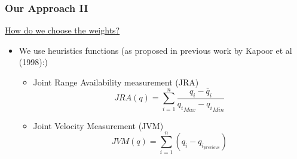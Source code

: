 \documentclass[10pt]{beamer}
\newcommand{\q}{\ensuremath{q}}
\begin{document}
\begin{frame}
\frametitle{Our Approach II}

\begin{center}
	\begin{normalsize}
		{\color{blue} \underline{How do we choose the weights?}}
	\end{normalsize}
\end{center}

\begin{itemize}
\item{ We use heuristics functions (as proposed in previous work by Kapoor et al (1998):) 
	\begin{itemize}
		\item{ {\color{blue}Joint Range Availability measurement (JRA) }
			\begin{equation}
				JRA(\q)=  \displaystyle \sum_{i=1}^{n} \dfrac{ \q_{i} - {\bar{\q}}_{i} }{ {\q_{i}}_{Max} - {\q_{i}}_{Min} }
			\end{equation} }

		\item{ {\color{blue}Joint Velocity Measurement (JVM)}		
			\begin{equation}
				JVM(\q)=  \displaystyle \sum_{i=1}^{n} ( \q_{i} - {\q}_{i}_{previous} )
			\end{equation}		
		}

	\end{itemize}
}
\end{itemize}
\end{frame}
\end{document}
